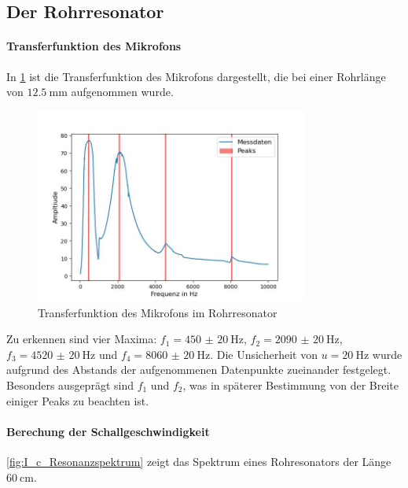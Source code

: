 \documentclass[../main.tex]{subfiles}
\begin{document}
    
\subsection{Der Rohrresonator}
    \paragraph{Transferfunktion des Mikrofons}
        In \ref{fig:I_Transferfunktion} ist die Transferfunktion des Mikrofons dargestellt, die bei einer Rohrlänge von $\SI{12.5}{\milli\metre}$ aufgenommen wurde.

        \begin{figure}[H]
            \centering
            \includegraphics[width=0.8\textwidth]{Bilddateien/Auswertung/I_Transferfunktion.jpg}
            \caption{Transferfunktion des Mikrofons im Rohrresonator}
            \label{fig:I_Transferfunktion}
        \end{figure}

        Zu erkennen sind vier Maxima: $f_1=\SI{450(20)}{\hertz}$, $f_2=\SI{2090(20)}{\hertz}$, $f_3=\SI{4520(20)}{\hertz}$ und $f_4=\SI{8060(20)}{\hertz}$. Die Unsicherheit von $u=\SI{20}{\hertz}$ wurde aufgrund des Abstands der aufgenommenen Datenpunkte zueinander festgelegt. Besonders ausgeprägt sind $f_1$ und $f_2$, was in späterer Bestimmung von der Breite einiger Peaks zu beachten ist.
    
    \paragraph{Berechung der Schallgeschwindigkeit}
        \ref{fig:I_c_Resonanzspektrum} zeigt das Spektrum eines Rohresonators der Länge $\SI{60}{\centi\metre}$.
\end{document}
